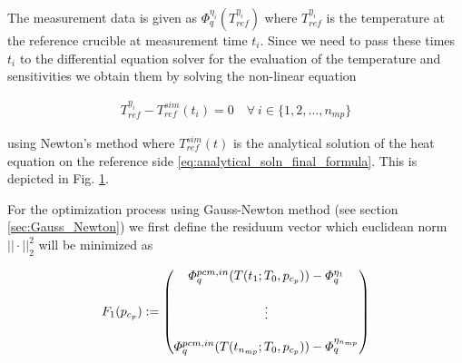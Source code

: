 \documentclass{scrartcl}[12pt, halfparskip]
\begin{document}
The measurement data is given as $\varPhi_q^{\eta_i}(T_{ref}^{\eta_i})$ where $T_{ref}^{\eta_i}$ is the temperature at the reference crucible at measurement time $t_i$. Since we need to pass these times $t_i$ to the differential equation solver for the evaluation of the temperature and sensitivities we obtain them by solving the non-linear equation 

\begin{align}
	T_{ref}^{\eta_i} - T_{ref}^{sim}(t_i) = 0 \quad \forall \ i \in \{1,2,...,n_{mp}\}
\end{align}

using Newton's method where $T_{ref}^{sim}(t)$ is the analytical solution of the heat equation on the reference side \eqref{eq:analytical_soln_final_formula}. This is depicted in Fig. \ref{fig:obtaining_measurement_times}.


\begin{figure}[H]
	\centering
	\caption{}
	\label{fig:obtaining_measurement_times}
\end{figure}


\begin{flushright}
	
\end{flushright}
For the optimization process using Gauss-Newton method (see section \ref{sec:Gauss_Newton}) we first define the residuum vector which euclidean norm $|| \cdot ||_2^2$ will be minimized as 

\begin{equation}
	F_1(p_{c_p}) :=
	\begin{pmatrix}
		\varPhi_{q}^{pcm,in}(T(t_1;T_0,p_{c_p})) - \varPhi_q^{\eta_1} \\
		\textcolor{white}{} \\
		\vdots \\
		\textcolor{white}{} \\
		\varPhi_{q}^{pcm,in}(T(t_{n_{mp}};T_0,p_{c_p})) - \varPhi_q^{\eta_{n_{mp}}}
	\end{pmatrix}
\end{equation} \\
\end{document}
